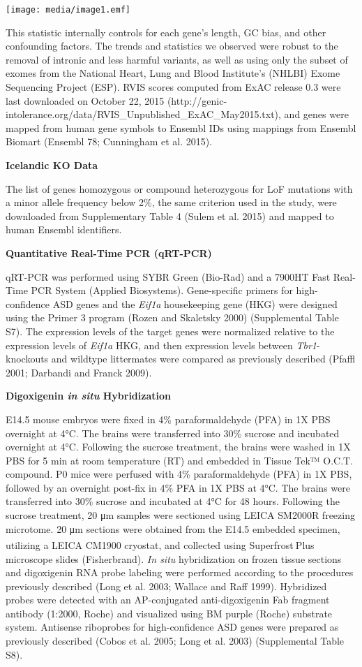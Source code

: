 \documentclass[]{article}
\begin{document}
\texttt{[image: media/image1.emf]}

This statistic internally controls for each gene's length, GC bias, and
other confounding factors. The trends and statistics we observed were
robust to the removal of intronic and less harmful variants, as well as
using only the subset of exomes from the National Heart, Lung and Blood
Institute's (NHLBI) Exome Sequencing Project (ESP). RVIS scores computed
from ExAC release 0.3 were last downloaded on October 22, 2015
(http://genic-intolerance.org/data/RVIS\_Unpublished\_ExAC\_May2015.txt),
and genes were mapped from human gene symbols to Ensembl IDs using
mappings from Ensembl Biomart (Ensembl 78; Cunningham et al. 2015).

\textbf{Icelandic KO Data}

The list of genes homozygous or compound heterozygous for LoF mutations
with a minor allele frequency below 2\%, the same criterion used in the
study, were downloaded from Supplementary Table 4 (Sulem et al. 2015)
and mapped to human Ensembl identifiers.

\textbf{Quantitative Real-Time PCR (qRT-PCR)}

qRT-PCR was performed using SYBR Green (Bio-Rad) and a 7900HT Fast
Real-Time PCR System (Applied Biosystems). Gene-speciﬁc primers for
high-confidence ASD genes and the \emph{Eif1a} housekeeping gene (HKG)
were designed using the Primer 3 program (Rozen and Skaletsky 2000)
(Supplemental Table S7). The expression levels of the target genes were
normalized relative to the expression levels of \emph{Eif1a} HKG, and
then expression levels between \emph{Tbr1}-knockouts and wildtype
littermates were compared as previously described (Pfaffl 2001; Darbandi
and Franck 2009).

\textbf{Digoxigenin \emph{in situ} Hybridization}

E14.5 mouse embryos were fixed in 4\% paraformaldehyde (PFA) in 1X PBS
overnight at 4°C. The brains were transferred into 30\% sucrose and
incubated overnight at 4°C. Following the sucrose treatment, the brains
were washed in 1X PBS for 5 min at room temperature (RT) and embedded in
Tissue Tek™ O.C.T. compound. P0 mice were perfused with 4\%
paraformaldehyde (PFA) in 1X PBS, followed by an overnight post-fix in
4\% PFA in 1X PBS at 4°C. The brains were transferred into 30\% sucrose
and incubated at 4°C for 48 hours. Following the sucrose treatment, 20
μm samples were sectioned using LEICA SM2000R freezing microtome. 20 μm
sections were obtained from the E14.5 embedded specimen, utilizing a
LEICA CM1900 cryostat, and collected using
Superfrost\textsuperscript{}Plus microscope slides (Fisherbrand).
\emph{In situ} hybridization on frozen tissue sections and digoxigenin
RNA probe labeling were performed according to the procedures previously
described (Long et al. 2003; Wallace and Raff 1999). Hybridized probes
were detected with an AP-conjugated anti-digoxigenin Fab fragment
antibody (1:2000, Roche) and visualized using BM purple (Roche)
substrate system. Antisense riboprobes for high-confidence ASD genes
were prepared as previously described (Cobos et al. 2005; Long et al.
2003) (Supplemental Table S8).
\end{document}
